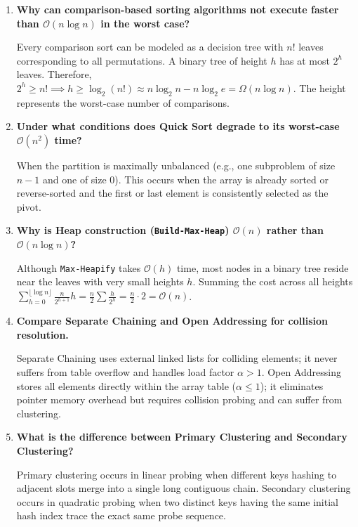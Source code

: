 \documentclass[12pt,a4paper]{article}
\newcommand{\Q}[1]{\textbf{#1}\par\noindent\ignorespaces}
\begin{document}
\begin{tcolorbox}[exambox, title={\textbf{Frequently Asked / Viva Questions (Part 1)}}]
\begin{enumerate}[topsep=0pt, label=\textbf{Q\arabic*.}, itemsep=4pt]
  \item \Q{Why can comparison-based sorting algorithms not execute faster than $\mathcal{O}(n \log n)$ in the worst case?}
  Every comparison sort can be modeled as a decision tree with $n!$ leaves corresponding to all permutations. A binary tree of height $h$ has at most $2^h$ leaves. Therefore, $2^h \ge n! \implies h \ge \log_2(n!) \approx n \log_2 n - n \log_2 e = \Omega(n \log n)$. The height represents the worst-case number of comparisons.

  \item \Q{Under what conditions does Quick Sort degrade to its worst-case $\mathcal{O}(n^2)$ time?}
  When the partition is maximally unbalanced (e.g., one subproblem of size $n-1$ and one of size $0$). This occurs when the array is already sorted or reverse-sorted and the first or last element is consistently selected as the pivot.

  \item \Q{Why is Heap construction (\texttt{Build-Max-Heap}) $\mathcal{O}(n)$ rather than $\mathcal{O}(n \log n)$?}
  Although \texttt{Max-Heapify} takes $\mathcal{O}(h)$ time, most nodes in a binary tree reside near the leaves with very small heights $h$. Summing the cost across all heights $\sum_{h=0}^{\lfloor \log n \rfloor} \frac{n}{2^{h+1}} h = \frac{n}{2} \sum \frac{h}{2^h} = \frac{n}{2} \cdot 2 = \mathcal{O}(n)$.

  \item \Q{Compare Separate Chaining and Open Addressing for collision resolution.}
  Separate Chaining uses external linked lists for colliding elements; it never suffers from table overflow and handles load factor $\alpha > 1$. Open Addressing stores all elements directly within the array table ($\alpha \le 1$); it eliminates pointer memory overhead but requires collision probing and can suffer from clustering.

  \item \Q{What is the difference between Primary Clustering and Secondary Clustering?}
  Primary clustering occurs in linear probing when different keys hashing to adjacent slots merge into a single long contiguous chain. Secondary clustering occurs in quadratic probing when two distinct keys having the same initial hash index trace the exact same probe sequence.


\end{enumerate}
\end{tcolorbox}
\end{document}
